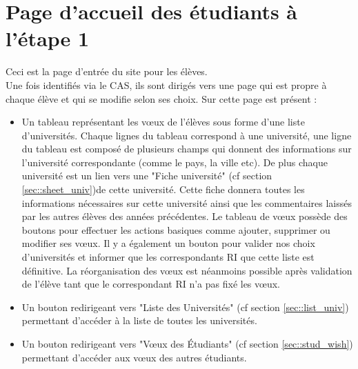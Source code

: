 \section{Page d'accueil des étudiants à l'étape 1}

Ceci est la page d'entrée du site pour les élèves.\\
Une fois identifiés via le CAS, ils sont dirigés vers une page qui est propre à chaque élève et qui se modifie selon ses choix.
Sur cette page est présent :
\begin{itemize}

\item Un tableau représentant les vœux de l'élèves sous forme d'une liste d'universités.
Chaque lignes du tableau correspond à une université, une ligne du tableau est composé de plusieurs champs qui donnent des informations sur l'université correspondante (comme le pays, la ville etc).
De plus chaque université est un lien vers une "Fiche université" (cf section \ref{sec::sheet_univ})de cette université. Cette fiche donnera toutes les informations nécessaires sur cette université ainsi que les commentaires laissés par les autres élèves des années précédentes.
Le tableau de vœux possède des boutons pour effectuer les actions basiques comme ajouter, supprimer ou modifier ses vœux. Il y a également un bouton pour valider nos choix d'universités et informer que les correspondants RI que cette liste est définitive. La réorganisation des vœux est néanmoins possible après validation de l'élève tant que le correspondant RI n'a pas fixé les vœux.
\item Un bouton redirigeant vers "Liste des Universités" (cf section \ref{sec::list_univ}) permettant d'accéder à la liste de toutes les universités.
\item Un bouton redirigeant vers "Vœux des Étudiants" (cf section \ref{sec::stud_wish}) permettant d'accéder aux vœux des autres étudiants.

\end{itemize}
